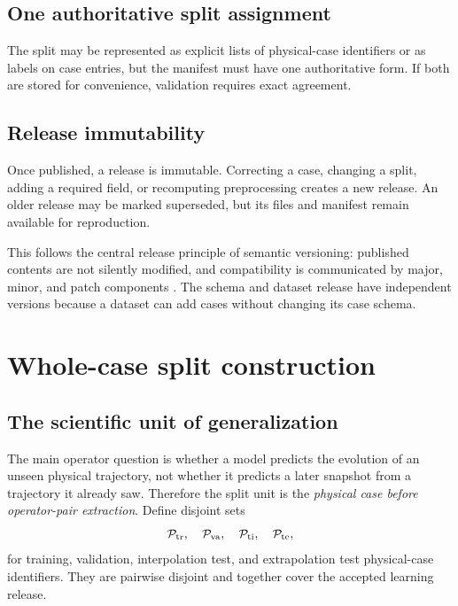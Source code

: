 \documentclass[11pt]{article}
\begin{document}
\subsection{One authoritative split assignment}

The split may be represented as explicit lists of physical-case identifiers or as labels on case entries, but the manifest must have one authoritative form. If both are stored for convenience, validation requires exact agreement.

\subsection{Release immutability}

Once published, a release is immutable. Correcting a case, changing a split, adding a required field, or recomputing preprocessing creates a new release. An older release may be marked superseded, but its files and manifest remain available for reproduction.

This follows the central release principle of semantic versioning: published contents are not silently modified, and compatibility is communicated by major, minor, and patch components \cite{SemVer}. The schema and dataset release have independent versions because a dataset can add cases without changing its case schema.

\section{Whole-case split construction}
\label{sec:splits}

\subsection{The scientific unit of generalization}

The main operator question is whether a model predicts the evolution of an unseen physical trajectory, not whether it predicts a later snapshot from a trajectory it already saw. Therefore the split unit is the \emph{physical case before operator-pair extraction}. Define disjoint sets
\begin{equation}
\mathcal P_{\rm tr},\quad \mathcal P_{\rm va},\quad \mathcal P_{\rm ti},\quad \mathcal P_{\rm te},
\end{equation}
for training, validation, interpolation test, and extrapolation test physical-case identifiers. They are pairwise disjoint and together cover the accepted learning release.
\end{document}
